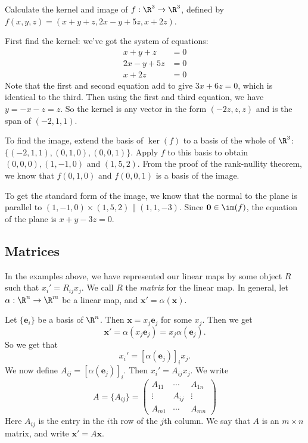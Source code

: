 \documentclass[a4paper]{article}
\begin{document}
\begin{eg}
  Calculate the kernel and image of $f:\R^3\to \R^3$, defined by $f(x, y, z) = (x + y + z, 2x - y+ 5z, x + 2z)$.

  First find the kernel: we've got the system of equations:
  \begin{align*}
    x + y + z &= 0\\
    2x - y + 5z &= 0\\
    x + 2z &= 0
  \end{align*}
  Note that the first and second equation add to give $3x + 6z = 0$, which is identical to the third. Then using the first and third equation, we have $y = -x - z = z$. So the kernel is any vector in the form $(-2z, z, z)$ and is the span of $(-2, 1, 1)$.

  To find the image, extend the basis of $\ker(f)$ to a basis of the whole of $\R^3$: $\{(-2, 1, 1), (0, 1, 0), (0, 0, 1)\}$. Apply $f$ to this basis to obtain $(0, 0, 0), (1, -1, 0)$ and $(1, 5, 2)$. From the proof of the rank-nullity theorem, we know that $f(0, 1, 0)$ and $f(0, 0, 1)$ is a basis of the image.

  To get the standard form of the image, we know that the normal to the plane is parallel to $(1, -1, 0)\times (1, 5, 2) \parallel (1, 1, -3)$. Since $\mathbf{0}\in \im (f)$, the equation of the plane is $x + y - 3z = 0$.
\end{eg}

\subsection{Matrices}
In the examples above, we have represented our linear maps by some object $R$ such that $x_i' = R_{ij}x_j$. We call $R$ the \emph{matrix} for the linear map. In general, let $\alpha: \R^n \to \R^m$ be a linear map, and $\mathbf{x}' = \alpha(\mathbf{x})$.

Let $\{\mathbf{e}_i\}$ be a basis of $\R^n$. Then $\mathbf{x} = x_j \mathbf{e}_j$ for some $x_j$. Then we get
\[
  \mathbf{x}' = \alpha(x_j \mathbf{e}_j) = x_j \alpha(\mathbf{e}_j).
\]
So we get that
\[
  x_i' = [\alpha(\mathbf{e}_j)]_i x_j.
\]
We now define $A_{ij} = [\alpha(\mathbf{e}_j)]_i$. Then $x_i' = A_{ij}x_j$. We write
\[
  A = \{A_{ij}\} =
  \begin{pmatrix}
    A_{11} & \cdots & A_{1n}\\
    \vdots & A_{ij} & \vdots\\
    A_{m1} & \cdots & A_{mn}
  \end{pmatrix}
\]
Here $A_{ij}$ is the entry in the $i$th row of the $j$th column. We say that $A$ is an $m\times n$ matrix, and write $\mathbf{x}' = A\mathbf{x}$.
\end{document}
